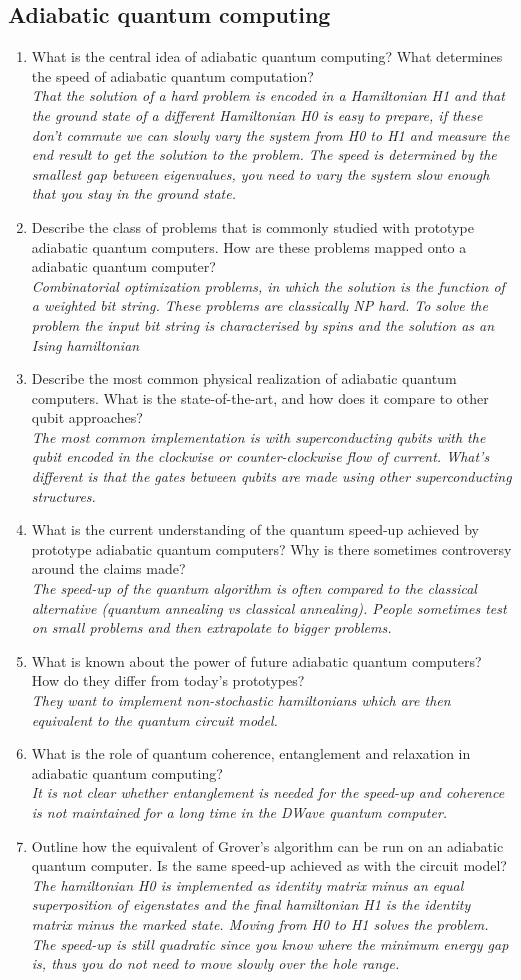 \documentclass[a4paper]{scrartcl}
\newcommand{\qa}[2]{#1\\ \textit{#2}}
\begin{document}
\subsection*{Adiabatic quantum computing}
\begin{enumerate}
\item \qa{What is the central idea of adiabatic quantum computing? What determines the speed of adiabatic quantum computation?}{That the solution of a hard problem is encoded in a Hamiltonian H1 and that the ground state of a different Hamiltonian H0 is easy to prepare, if these don't commute we can slowly vary the system from H0 to H1 and measure the end result to get the solution to the problem. The speed is determined by the smallest gap between eigenvalues, you need to vary the system slow enough that you stay in the ground state.}
\item \qa{Describe the class of problems that is commonly studied with prototype adiabatic quantum computers. How are these problems mapped onto a adiabatic quantum computer?}{Combinatorial optimization problems, in which the solution is the function of a weighted bit string. These problems are classically NP hard. To solve the problem the input bit string is characterised by spins and the solution as an Ising hamiltonian}
\item \qa{Describe the most common physical realization of adiabatic quantum computers. What is the state-of-the-art, and how does it compare to other qubit approaches?}{The most common implementation is with superconducting qubits with the qubit encoded in the clockwise or counter-clockwise flow of current. What's different is that the gates between qubits are made using other superconducting structures.}
\item \qa{What is the current understanding of the quantum speed-up achieved by prototype adiabatic quantum computers? Why is there sometimes controversy around the claims made?}{The speed-up of the quantum algorithm is often compared to the classical alternative (quantum annealing vs classical annealing). People sometimes test on small problems and then extrapolate to bigger problems.}
\item \qa{What is known about the power of future adiabatic quantum computers? How do they differ from today's prototypes?}{They want to implement non-stochastic hamiltonians which are then equivalent to the quantum circuit model.}
\item \qa{What is the role of quantum coherence, entanglement and relaxation in adiabatic quantum computing?}{It is not clear whether entanglement is needed for the speed-up and coherence is not maintained for a long time in the DWave quantum computer.}
\item \qa{Outline how the equivalent of Grover's algorithm can be run on an adiabatic quantum computer. Is the same speed-up achieved as with the circuit model? }{The hamiltonian H0 is implemented as identity matrix minus an equal superposition of eigenstates and the final hamiltonian H1 is the identity matrix minus the marked state. Moving from H0 to H1 solves the problem. The speed-up is still quadratic since you know where the minimum energy gap is, thus you do not need to move slowly over the hole range.}


\end{enumerate}
\end{document}
